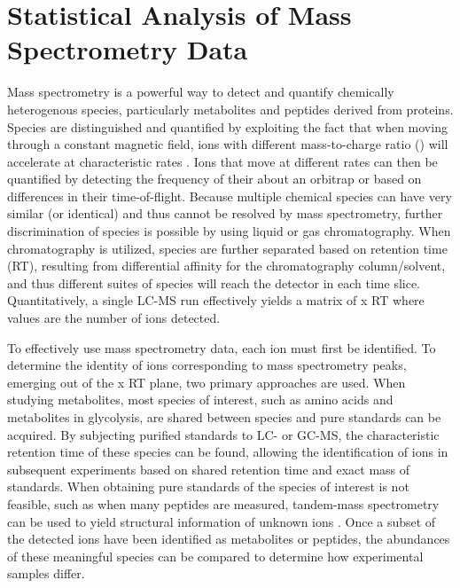 
\chapter{Statistical Analysis of Mass Spectrometry Data\label{ch:quant_anal}}

Mass spectrometry is a powerful way to detect and quantify chemically heterogenous species, particularly metabolites and peptides derived from proteins. Species are distinguished and quantified by exploiting the fact that when moving through a constant magnetic field, ions with different mass-to-charge ratio () will accelerate at characteristic rates \cite{Boyd:2011vt}.  Ions that move at different rates can then be quantified by detecting the frequency of their  about an orbitrap or based on differences in their time-of-flight.  Because multiple chemical species can have very similar (or identical)  and thus cannot be resolved by mass spectrometry, further discrimination of species is possible by using liquid or gas chromatography.  When chromatography is utilized, species are further separated based on retention time (RT), resulting from differential affinity for the chromatography column/solvent, and thus different suites of species will reach the detector in each time slice.  Quantitatively, a single LC-MS run effectively yields a matrix of  x RT where values are the number of ions detected.  

To effectively use mass spectrometry data, each ion must first be identified. To determine the identity of ions corresponding to mass spectrometry peaks, emerging out of the  x RT plane, two primary approaches are used.  When studying metabolites, most species of interest, such as amino acids and metabolites in glycolysis, are shared between species and pure standards can be acquired.  By subjecting purified standards to LC- or GC-MS, the characteristic retention time of these species can be found, allowing the identification of ions in subsequent experiments based on shared retention time and exact mass of standards.  When obtaining pure standards of the species of interest is not feasible, such as when many peptides are measured, tandem-mass spectrometry can be used to yield structural information of unknown ions \cite{Nesvizhskii:2005jp, Huang:2012tl}.  Once a subset of the detected ions have been identified as metabolites or peptides, the abundances of these meaningful species can be compared to determine how experimental samples differ.

